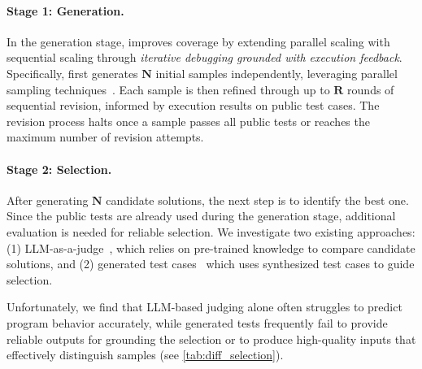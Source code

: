 \paragraph{Stage 1: Generation.}
\label{sec:scale_parallel_samples}
In the generation stage, \frameworkname improves coverage by extending parallel scaling with sequential scaling through \textit{iterative debugging grounded with execution feedback}. Specifically, \frameworkname first generates $\mathbf{N}$ initial samples independently, leveraging parallel sampling techniques~\citep{chen2023teaching}. Each sample is then refined through up to $\mathbf{R}$ rounds of sequential revision, informed by execution results on public test cases. The revision process halts once a sample passes all public tests or reaches the maximum number of revision attempts.



\paragraph{Stage 2: Selection.}
\label{sec:scale_selection}
After generating $\mathbf{N}$ candidate solutions, the next step is to identify the best one. Since the public tests are already used during the generation stage, additional evaluation is needed for reliable selection. We investigate two existing approaches: (1) LLM-as-a-judge~\citep{zheng2023judging}, which relies on pre-trained knowledge to compare candidate solutions, and (2) generated test cases~\citep{li2022competition, chen2022codet}
which uses synthesized test cases to guide selection.

Unfortunately, we find that LLM-based judging alone often struggles to predict program behavior accurately, while generated tests frequently fail to provide reliable outputs for grounding the selection or to produce high-quality inputs that effectively distinguish samples (see \cref{tab:diff_selection}).


